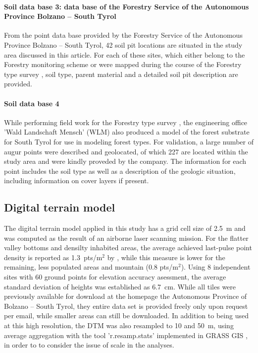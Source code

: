 \documentclass[preprint,12pt,authoryear]{elsarticle}
\begin{document}
\paragraph{Soil data base 3: data base of the Forestry Service of the Autonomous Province Bolzano -- South Tyrol} 
From the point data base provided by the Forestry Service of the Autonomous
Province Bolzano -- South Tyrol, 42 soil pit locations  are situated in the study area discussed in this article. For each of these sites, which either belong to the Forestry monitoring scheme or were mapped during the course of the Forestry type survey \citep{APB2006}, soil type, parent material and a detailed soil pit description are provided.

\paragraph{Soil data base 4} 
While performing field work for the Forestry type survey \citep{APB2006}, the engineering office 'Wald Landschaft Mensch' (WLM) also produced a model of the forest substrate for South Tyrol for use in modeling forest types. For validation, a large number of augur points were described and geolocated, of which 227 are located within the study area and were kindly proveded by the company. The information for each point includes the soil type as well as a description of the geologic situation, including information on cover layers if present.


\subsection{Digital terrain model}
The digital terrain model applied in this study has a grid cell size of 2.5~m and was computed as the result of an airborne laser scanning mission. For the flatter valley bottoms and densilty inhabited areas, the average achieved last-pulse point density is reported as 1.3~pts/m$^2$ by \cite{Wack2005}, while this measure is lower for the remaining, less populated areas and mountain (0.8 pts/m$^2$). Using 8 independent sites with 60 ground points for elevation accuracy asessment, the average standard deviation of heights was established as 6.7~cm. While all tiles were previously available for download at the homepage the Autonomous Province of Bolzano --  South Tyrol, they entire data set is provided freely only upon request per email, while smaller areas can still be downloaded. In addition to being used at this high resolution,  the DTM was also resampled to 10 and 50~m, using average aggregation with the tool 'r.resamp.stats' implemented in GRASS GIS \citep{GRASS}, in order to to consider the issue of scale in the analyses.
\end{document}
